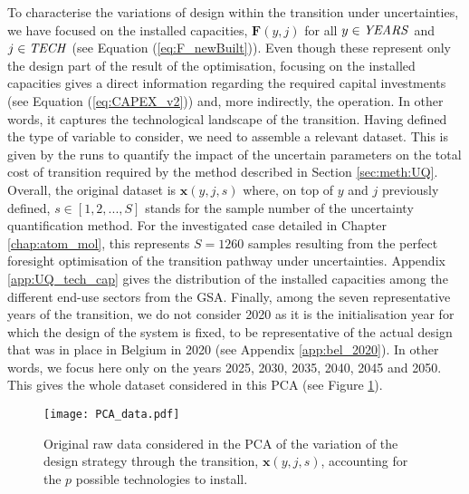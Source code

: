 \noindent
To characterise the variations of design within the transition under uncertainties, we have focused on the installed capacities, $\textbf{F}(y,j)$ for all $y \in \text{\emph{YEARS}}$ and $j \in \text{\emph{TECH}}$ (see Equation (\ref{eq:F_newBuilt})). Even though these represent only the design part of the result of the optimisation, focusing on the installed capacities gives a direct information regarding the required capital investments (see Equation (\ref{eq:CAPEX_v2})) and, more indirectly, the operation. In other words, it captures the technological landscape of the transition.  Having defined the type of variable to consider, we need to assemble a relevant dataset. This is given by the runs to quantify the impact of the uncertain parameters on the total cost of transition required by the method described in Section \ref{sec:meth:UQ}. Overall, the original dataset is $\textbf{x}(y,j,s)$ where, on top of $y$ and $j$ previously defined, $s \in [1,2,...,S]$ stands for the sample number of the uncertainty quantification method. For the investigated case detailed in Chapter \ref{chap:atom_mol}, this represents $S=1260$ samples resulting from the perfect foresight optimisation of the transition pathway under uncertainties. Appendix \ref{app:UQ_tech_cap} gives the distribution of the installed capacities among the different end-use sectors from the \gls{GSA}. Finally, among the seven representative years of the transition, we do not consider 2020 as it is the initialisation year for which the design of the system is fixed, to be representative of the actual design that was in place in Belgium in 2020 (see Appendix \ref{app:bel_2020}). In other words, we focus here only on the years 2025, 2030, 2035, 2040, 2045 and 2050. This gives the whole dataset considered in this \gls{PCA} (see Figure \ref{fig:PCA_data}). \\

\begin{figure}[!htbp]
\centering
\texttt{[image: PCA\_data.pdf]}
\caption{Original raw data considered in the \acrfull{PCA} of the variation of the design strategy through the transition, $\textbf{x}(y,j,s)$, accounting for the $p$ possible technologies to install.}
\label{fig:PCA_data}
\end{figure}

\\

